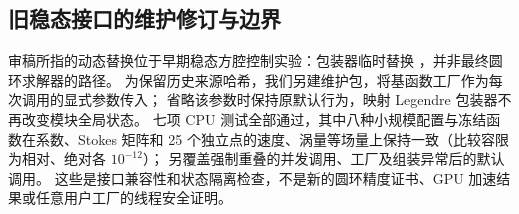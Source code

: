 \subsection{旧稳态接口的维护修订与边界}
审稿所指的动态替换位于早期稳态方腔控制实验：包装器临时替换
，并非最终圆环求解器的路径。
为保留历史来源哈希，我们另建维护包，将基函数工厂作为每次调用的显式参数传入；
省略该参数时保持原默认行为，映射 Legendre 包装器不再改变模块全局状态。
七项 CPU 测试全部通过，其中八种小规模配置与冻结函数在系数、Stokes 矩阵和
25 个独立点的速度、涡量等场量上保持一致（比较容限为相对、绝对各 $10^{-12}$）；
另覆盖强制重叠的并发调用、工厂及组装异常后的默认调用。
这些是接口兼容性和状态隔离检查，不是新的圆环精度证书、GPU 加速结果或任意用户工厂的线程安全证明。
